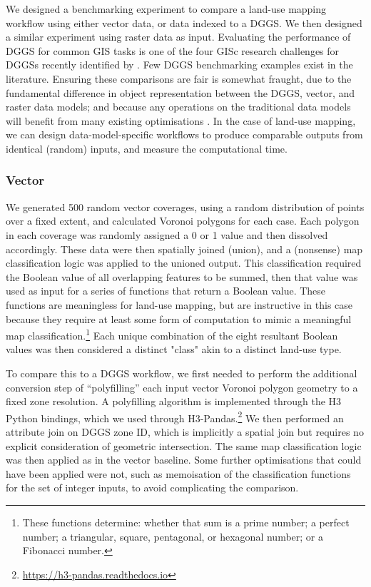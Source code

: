 \documentclass[]{interact}
\theoremstyle{plain}%
\theoremstyle{definition}
\theoremstyle{remark}
\begin{document}
We designed a benchmarking experiment to compare a land-use mapping workflow using either vector data, or data indexed to a \ac{DGGS}. We then designed a similar experiment using raster data as input. Evaluating the performance of \ac{DGGS} for common \ac{GIS} tasks is one of the four \ac{GISc} research challenges for \acp{DGGS} recently identified by \citet{hojati2022giscience}. Few \ac{DGGS} benchmarking examples exist in the literature. Ensuring these comparisons are fair is somewhat fraught, due to the fundamental difference in object representation between the DGGS, vector, and raster data models; and because any operations on the traditional data models will benefit from many existing optimisations \citep{hojati2022giscience}. In the case of land-use mapping, we can design data-model-specific workflows to produce comparable outputs from identical (random) inputs, and measure the computational time.

\subsubsection{Vector}

We generated 500 random vector coverages, using a random distribution of points over a fixed extent, and calculated Voronoi polygons for each case. Each polygon in each coverage was randomly assigned a 0 or 1 value and then dissolved accordingly. These data were then spatially joined (union), and a (nonsense) map classification logic was applied to the unioned output. This classification required the Boolean value of all overlapping features to be summed, then that value was used as input for a series of functions that return a Boolean value. These functions are meaningless for land-use mapping, but are instructive in this case because they require at least some form of computation to mimic a meaningful map classification.\footnote{These functions determine: whether that sum is a prime number; a perfect number; a triangular, square, pentagonal, or hexagonal number; or a Fibonacci number.} Each unique combination of the eight resultant Boolean values was then considered a distinct "class" akin to a distinct land-use type.

To compare this to a \ac{DGGS} workflow, we first needed to perform the additional conversion step of ``polyfilling'' each input vector Voronoi polygon geometry to a fixed zone resolution. A polyfilling algorithm is implemented through the H3 Python bindings, which we used through H3-Pandas.\footnote{\url{https://h3-pandas.readthedocs.io}} We then performed an attribute join on \ac{DGGS} zone ID, which is implicitly a spatial join but requires no explicit consideration of geometric intersection. The same map classification logic was then applied as in the vector baseline. Some further optimisations that could have been applied were not, such as memoisation of the classification functions for the set of integer inputs, to avoid complicating the comparison.
\end{document}
